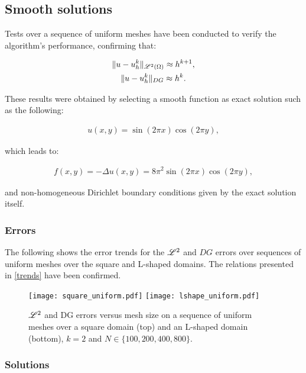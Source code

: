 \subsection{Smooth solutions}

Tests over a sequence of uniform meshes have been conducted to verify the algorithm's performance, confirming that:

\begin{gather} \label{trends}
    \lVert u - u^k_h \rVert_{\mathscr{L}^2(\Omega)} \approx h^{k + 1}, \\
    \lVert u - u^k_h \rVert_{DG} \approx h^k.
\end{gather}

These results were obtained by selecting a smooth function as exact solution such as the following:

\begin{gather}
    u(x, y) = \sin(2 \pi x) \cos(2 \pi y),
\end{gather}

which leads to:

\begin{gather}
    f(x, y) = -\Delta u(x, y) = 8 \pi^2 \sin(2 \pi x) \cos(2 \pi y),
\end{gather}

and non-homogeneous Dirichlet boundary conditions given by the exact solution itself.

\newpage
\subsubsection{Errors}

The following shows the error trends for the $\mathscr{L}^2$ and $DG$ errors over sequences of uniform meshes over the square and L-shaped domains. The relations presented in \eqref{trends} have been confirmed.

\begin{figure}[!ht]
	\centering
	\texttt{[image: square\_uniform.pdf]}
    \texttt{[image: lshape\_uniform.pdf]}
	\caption{$\mathscr{L}^2$ and DG errors versus mesh size on a sequence of uniform meshes over a square domain (top) and an L-shaped domain (bottom), $k = 2$ and $N \in \{100, 200, 400, 800\}$.}
\end{figure}

\newpage
\subsubsection{Solutions}

